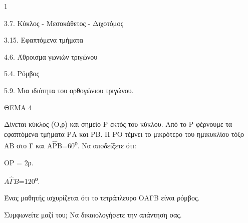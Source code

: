 \begin{ylh}{1}
    \item 3.7. Κύκλος - Μεσοκάθετος - Διχοτόμος
    \item 3.15. Εφαπτόμενα τμήματα
    \item 4.6. Άθροισμα γωνιών τριγώνου
    \item 5.4. Ρόμβος
    \item 5.9. Μια ιδιότητα του ορθογώνιου τριγώνου.
\end{ylh}

ΘΕΜΑ 4

Δίνεται κύκλος (Ο,ρ) και σημείο Ρ εκτός του κύκλου. Από το Ρ φέρνουμε τα εφαπτόμενα τμήματα ΡΑ και ΡΒ. Η ΡΟ τέμνει το μικρότερο του ημικυκλίου τόξο ΑΒ στο Γ και $\text{Α}\widehat{\text{Ρ}}\text{Β=60}$\textsuperscript{ο}. Να αποδείξετε ότι:

\begin{alist}
\item ΟΡ = 2ρ. 

\item $Α\widehat{\Gamma}Β$=120\textsuperscript{ο}. 

\item Ένας μαθητής ισχυρίζεται ότι το τετράπλευρο ΟΑΓΒ είναι ρόμβος.

Συμφωνείτε μαζί του; Να δικαιολογήσετε την απάντηση σας. 


\begin{center}
\end{center}
\end{alist}
